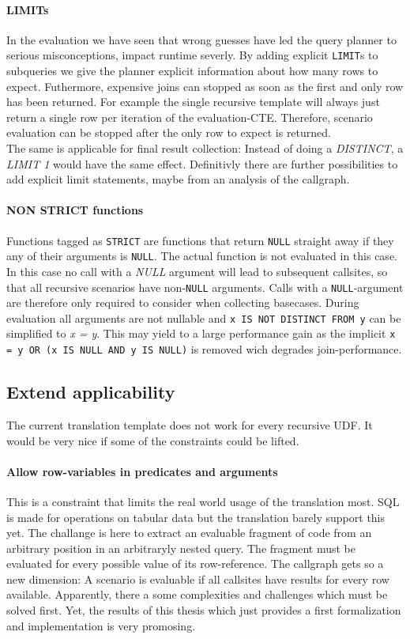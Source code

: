 \paragraph*{LIMITs}
In the evaluation we have seen that wrong guesses have led the query planner to serious misconceptions, impact runtime severly. By adding explicit \texttt{LIMIT}s to subqueries we give the planner explicit information about how many rows to expect. Futhermore, expensive joins can stopped as soon as the first and only row has been returned. For example the single recursive template will always just return a single row per iteration of the evaluation-CTE. Therefore, scenario evaluation can be stopped after the only row to expect is returned.\\
The same is applicable for final result collection: Instead of doing a \textit{DISTINCT}, a \textit{LIMIT 1} would have the same effect. Definitivly there are further possibilities to add explicit limit statements, maybe from an analysis of the callgraph.

\paragraph*{NON STRICT functions}
Functions tagged as \texttt{STRICT} are functions that return \texttt{NULL} straight away if they any of their arguments is \texttt{NULL}. The actual function is not evaluated in this case. In this case no call with a \textit{NULL} argument will lead to subsequent callsites, so that all recursive scenarios have non-\texttt{NULL} arguments. Calls with a \texttt{NULL}-argument are therefore only required to consider when collecting basecases. During evaluation all arguments are not nullable and \texttt{x IS NOT DISTINCT FROM y} can be simplified to \textit{x = y}. This may yield to a large performance gain as the implicit \texttt{x = y OR (x IS NULL AND y IS NULL)} is removed wich degrades join-performance.

\subsection{Extend applicability}

The current translation template does not work for every recursive UDF. It would be very nice if some of the constraints could be lifted.

\paragraph*{Allow row-variables in predicates and arguments}
This is a constraint that limits the real world usage of the translation most. SQL is made for operations on tabular data but the translation barely support this yet. The challange is here to extract an evaluable fragment of code from an arbitrary position in an arbitraryly nested query. The fragment must be evaluated for every possible value of its row-reference. The callgraph gets so a new dimension: A scenario is evaluable if all callsites have results for every row available.
Apparently, there a some complexities and challenges which must be solved first. Yet, the results of this thesis which just provides a first formalization and implementation is very promosing.


